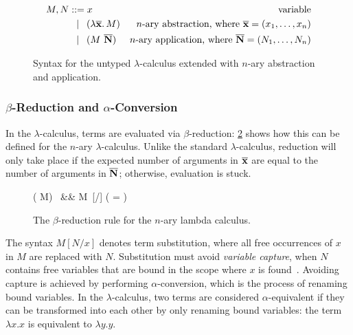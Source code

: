 \documentclass[../../../main.tex]{subfiles}
\begin{document}
\begin{figure}
\begin{align*}
M, N &\mathrel{::=} x & \text{variable} \\
&\mathrel{\enspace\mid\enspace} (\lambda {\overline{\mathbf{x}}}\ldotp M) & \text{$n$-ary abstraction, where } \overline{\mathbf{x}} = (x_1, \ldots, x_n) \\
&\mathrel{\enspace\mid\enspace} (M\ \overline{\mathbf{N}}) & \text{$n$-ary application, where } \overline{\mathbf{N}} = (N_1, \ldots, N_n)
\end{align*}
\caption{Syntax for the untyped $\lambda$-calculus extended with $n$-ary abstraction and application.}
\label{fig:lambda-calculus}
\end{figure}

\subsubsection{$\beta$-Reduction and $\alpha$-Conversion}
In the $\lambda$-calculus, terms are evaluated via $\beta$-reduction: \cref{fig:beta-reduction} shows how this can be defined for the $n$-ary $\lambda$-calculus.
Unlike the standard $\lambda$-calculus, reduction will only take place if the expected number of arguments in $\overline{\mathbf{x}}$ are equal to the number of arguments in $\overline{\mathbf{N}}$; otherwise, evaluation is stuck.

\begin{figure}[htbp]
\begin{lambdacalc}
( M)\  &\betastep& M\ [/] \hspace{3em} ( \lvert {} \rvert = \lvert {} \rvert)
\end{lambdacalc}
\caption{The $\beta$-reduction rule for the $n$-ary lambda calculus.}
\label{fig:beta-reduction}
\end{figure}

The syntax $M[N/x]$ denotes term substitution, where all free occurrences of $x$ in $M$ are replaced with $N$.
Substitution must avoid \emph{variable capture}, when $N$ contains free variables that are bound in the scope where $x$ is found~\cite{van-bakel_tsfpl_2022}.
Avoiding capture is achieved by performing $\alpha$-conversion, which is the process of renaming bound variables.
In the $\lambda$-calculus, two terms are considered $\alpha$-equivalent if they can be transformed into each other by only renaming bound variables: the term $\lambda x. x$ is equivalent to $\lambda y. y$.
\end{document}
